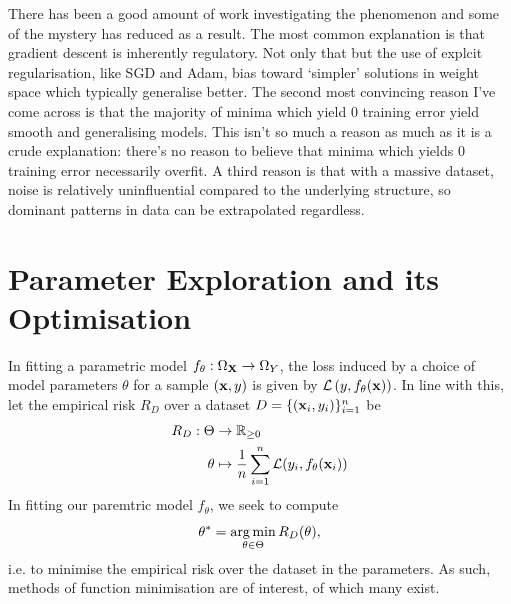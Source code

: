 \documentclass[11pt]{article}
\begin{document}
There has been a good amount of work investigating the phenomenon and some of the mystery has reduced as a result. The most common explanation is that gradient descent is inherently regulatory. Not only that but the use of explcit regularisation, like SGD and Adam, bias toward `simpler' solutions in weight space which typically generalise better. The second most convincing reason I've come across is that the majority of minima which yield 0 training error yield smooth and generalising models. This isn't so much a reason as much as it is a crude explanation: there's no reason to believe that minima which yields 0 training error necessarily overfit. A third reason is that with a massive dataset, noise is relatively uninfluential compared to the underlying structure, so dominant patterns in data can be extrapolated regardless.

\section{\REV{: }Parameter Exploration and its Optimisation}
In fitting a parametric model $f_{\theta}:\Omega_{\mathbf{X}}\to\Omega_{Y}$, the loss induced by a choice of model parameters $\theta$ for a sample $(\mathbf{x},y)$ is given by $\mathcal{L}\left(y,f_{\theta}(\mathbf{x})\right)$. In line with this, let the empirical risk $R_D$ over a dataset $D=\{(\mathbf{x}_i,y_i)\}_{i=1}^n$ be
\begin{align*}
    R_D:\Theta&\to\mathbb{R}_{\geq0}\\
    \theta&\mapsto\frac{1}{n}\sum_{i=1}^n\mathcal{L}(y_i,f_{\theta}(\mathbf{x}_i))
\end{align*}
In fitting our paremtric model $f_{\theta}$, we seek to compute
$$
\theta^{*}
=
\operatorname*{arg\,min}_{\theta\in\Theta}R_D(\theta),
$$
i.e. to minimise the empirical risk over the dataset in the parameters. As such, methods of function minimisation are of interest, of which many exist.
\end{document}
